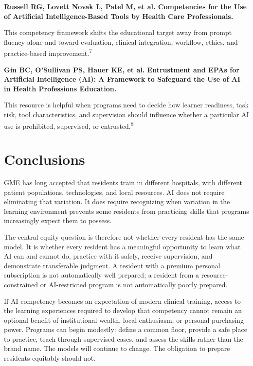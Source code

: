 \documentclass[12pt]{article}
\begin{document}
\textbf{Russell RG, Lovett Novak L, Patel M, et al. Competencies for the Use of
Artificial Intelligence-Based Tools by Health Care Professionals.}

This competency framework shifts the educational target away from prompt
fluency alone and toward evaluation, clinical integration, workflow,
ethics, and practice-based improvement.\textsuperscript{7}

\vspace{0.8em}

\textbf{Gin BC, O'Sullivan PS, Hauer KE, et al. Entrustment and EPAs for
Artificial Intelligence (AI): A Framework to Safeguard the Use of AI in Health
Professions Education.}

This resource is helpful when programs need to decide how learner readiness,
task risk, tool characteristics, and supervision should influence whether a
particular AI use is prohibited, supervised, or entrusted.\textsuperscript{8}

\section*{Conclusions}

GME has long accepted that residents train in different hospitals, with
different patient populations, technologies, and local resources. AI does not
require eliminating that variation. It does require recognizing when variation
in the learning environment prevents some residents from practicing skills
that programs increasingly expect them to possess.

The central equity question is therefore not whether every resident has the
same model. It is whether every resident has a meaningful opportunity to learn
what AI can and cannot do, practice with it safely, receive supervision, and
demonstrate transferable judgment. A resident with a premium personal
subscription is not automatically well prepared; a resident from a
resource-constrained or AI-restricted program is not automatically poorly
prepared.

If AI competency becomes an expectation of modern clinical training, access to
the learning experiences required to develop that competency cannot remain an
optional benefit of institutional wealth, local enthusiasm, or personal
purchasing power. Programs can begin modestly: define a common floor, provide a
safe place to practice, teach through supervised cases, and assess the skills
rather than the brand name. The models will continue to change. The obligation
to prepare residents equitably should not.
\end{document}
